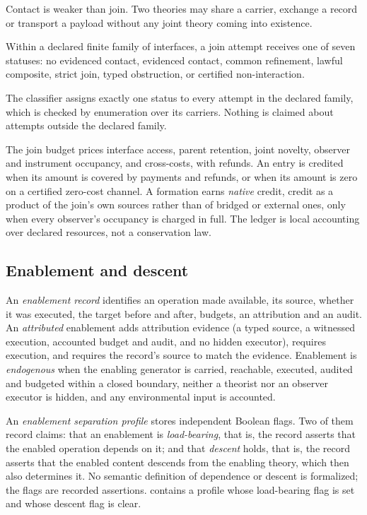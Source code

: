 Contact is weaker than join. Two theories may share a carrier, exchange a record or
transport a payload without any joint theory coming into existence.

\begin{definition}
\label{def:join-status}
Within a declared finite family of interfaces, a join attempt receives one of seven
statuses: no evidenced contact, evidenced contact, common refinement, lawful composite,
strict join, typed obstruction, or certified non-interaction.
\end{definition}

The classifier assigns exactly one status to every attempt in the declared family, which is
checked by enumeration over its carriers. Nothing is claimed about attempts outside the
declared family.

The join budget prices interface access, parent retention, joint novelty, observer and
instrument occupancy, and cross-costs, with refunds. An entry is credited when its amount
is covered by payments and refunds, or when its amount is zero on a certified zero-cost
channel. A formation earns \emph{native} credit, credit as a product of the
join's own sources rather than of bridged or external ones, only when every observer's
occupancy is charged in full. The ledger is local
accounting over declared resources, not a conservation law.

\subsection{Enablement and descent}

\begin{definition}
\label{def:enablement}
An \emph{enablement record} identifies an operation made available, its source, whether it
was executed, the target before and after, budgets, an attribution and an audit. An
\emph{attributed} enablement adds attribution evidence (a typed source, a witnessed
execution, accounted budget and audit, and no hidden executor), requires execution, and
requires the record's source to match the evidence. Enablement is \emph{endogenous} when
the enabling generator is carried, reachable, executed, audited and budgeted within a
closed boundary, neither a theorist nor an observer executor is hidden, and any
environmental input is accounted.
\end{definition}

An \emph{enablement separation profile} stores independent Boolean flags. Two of them
record claims: that an enablement is \emph{load-bearing}, that is, the record asserts that
the enabled operation depends on it; and that \emph{descent} holds, that is, the record
asserts that the enabled content descends from the enabling theory, which then also
determines it. No semantic definition of dependence or descent is formalized; the flags
are recorded assertions.  contains a profile whose load-bearing flag
is set and whose descent flag is clear.

